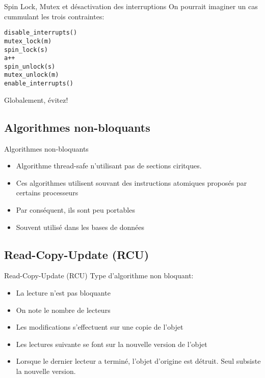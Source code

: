 \begin{frame}[fragile]{Spin Lock, Mutex et désactivation des interruptions}
  On pourrait imaginer un cas cummulant les trois contraintes:
  \begin{lstlisting}
disable_interrupts()
mutex_lock(m)
spin_lock(s)
a++
spin_unlock(s)
mutex_unlock(m)
enable_interrupts()
  \end{lstlisting}
  Globalement, évitez!
\end{frame}

\subsection{Algorithmes non-bloquants}

\begin{frame}{Algorithmes non-bloquants}
  \begin{itemize}
  \item Algorithme thread-safe n'utilisant pas de sections ciritques.
  \item Ces  algorithmes utilisent souvant  des instructions atomiques
    proposés par certains processeurs
  \item Par conséquent, ils sont peu portables
  \item Souvent utilisé dans les bases de données
  \end{itemize}
\end{frame}

\subsection{Read-Copy-Update (RCU)}

\begin{frame}{Read-Copy-Update (RCU)}
  Type d'algorithme non bloquant:
  \begin{itemize}
  \item La lecture n'est pas bloquante
  \item On note le nombre de lecteurs
  \item Les modifications s'effectuent sur une copie de l'objet
  \item Les lectures suivante se font sur la nouvelle version de l'objet
  \item Lorsque  le dernier lecteur  a terminé, l'objet  d'origine est
    détruit. Seul subsiste la nouvelle version.
  \end{itemize}
\end{frame}

